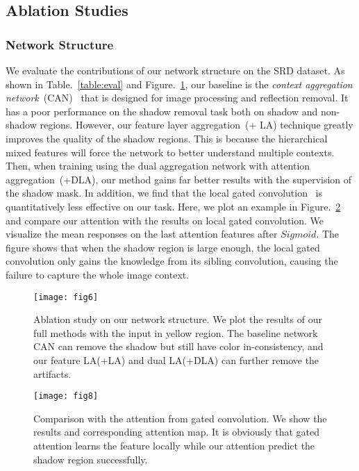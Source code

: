 \documentclass[letterpaper]{article} \usepackage{aaai20}  \usepackage{times}  \usepackage{helvet} \usepackage{courier}  \usepackage[hyphens]{url}  \urlstyle{rm} \def\UrlFont{\rm}  \usepackage{graphicx}  \frenchspacing  \setlength{\pdfpagewidth}{8.5in}  \setlength{\pdfpageheight}{11in}  \usepackage{amssymb}
\begin{document}
\subsection{Ablation Studies}	
\subsubsection{Network Structure}
We evaluate the contributions of our network structure on the SRD dataset. As shown in Table.~\ref{table:eval} and Figure.~\ref{fig:ablation}, our baseline is the \textit{context aggregation network}~(CAN)~\cite{2018arXiv180605376Z} that is designed for image processing and reflection removal. It has a poor performance on the shadow removal task both on shadow and non-shadow regions. However, our feature layer aggregation~(+ LA) technique greatly improves the quality of the shadow regions. This is because the hierarchical mixed features will force the network to better understand multiple contexts. Then, when training using the dual aggregation network with attention aggregation~(+DLA), our method gains far better results with the supervision of the shadow mask. In addition, we find that the local gated convolution~\cite{yu2018free} is quantitatively less effective on our task. Here, we plot an example in Figure.~\ref{fig:gated} and compare our attention with the results on local gated convolution. 
We visualize the mean responses on the last attention features after $Sigmoid$. The figure shows that when the shadow region is large enough, the local gated convolution only gains the knowledge from its sibling convolution, causing the failure to capture the whole image context. 


\begin{figure}[t]
 \centering
  \texttt{[image: fig6]}
  \caption{Ablation study on our network structure. We plot the results of our full methods with the input in yellow region. The baseline network CAN can remove the shadow but still have color in-consistency, and our feature LA(+LA) and dual LA(+DLA) can further remove the artifacts.}
  \label{fig:ablation}
\end{figure}

\begin{figure}[t]
 \centering
  \texttt{[image: fig8]}
  \caption{Comparison with the attention from gated convolution. We show the results and corresponding attention map. It is obviously that gated attention learns the feature locally while our attention predict the shadow region successfully.}
  \label{fig:gated}
\end{figure}
\end{document}
